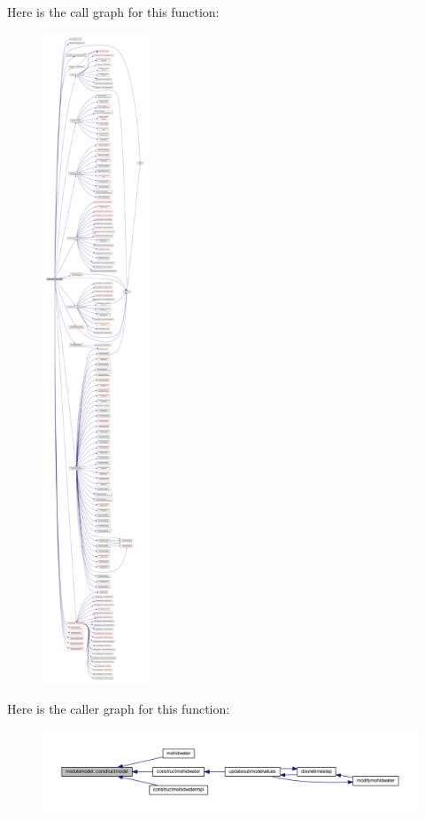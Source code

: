 Here is the call graph for this function\+:\nopagebreak
\begin{figure}[H]
\begin{center}
\leavevmode
\includegraphics[height=550pt]{namespacemodulemodel_a26ba9ff74ca1066f7a87bd019c76b1ed_cgraph}
\end{center}
\end{figure}
Here is the caller graph for this function\+:\nopagebreak
\begin{figure}[H]
\begin{center}
\leavevmode
\includegraphics[width=350pt]{namespacemodulemodel_a26ba9ff74ca1066f7a87bd019c76b1ed_icgraph}
\end{center}
\end{figure}
\mbox{\label{namespacemodulemodel_aa1baf5876ac43380b98e011bcf1517da}} 

